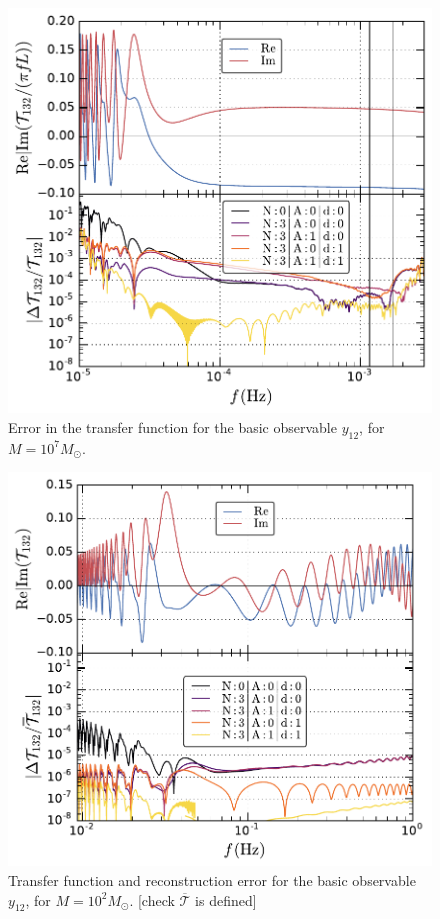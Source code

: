 \documentclass[aps,showpacs,twocolumn,
prd,superscriptaddress,nofootinbib]{revtex4-1}
\newcommand\calT{{\mathcal{T}}}
\newcommand{\Msol}{M_{\odot}}
\newcommand{\SM}[1]{{\color{Red} #1}}
\begin{document}
\begin{figure}
  \centering
  \includegraphics[width=.98\linewidth]{plots/LISAtransfererrorM1e7y12L_py.pdf}
  \caption{Error in the transfer function for the basic observable $y_{12}$, for $M=10^{7} \Msol$.}
  \label{fig:LISAerrorM1e7const}
\end{figure}

\begin{figure}
  \centering
  \includegraphics[width=.98\linewidth]{plots/LISAtransfererrorM1e2y12L_py.pdf}
  \caption{Transfer function and reconstruction error for the basic observable $y_{12}$, for $M=10^{2} \Msol$. \SM{[check $\overline{\calT}$ is defined]}}
  \label{fig:LISAerrorM1e2const}
\end{figure}
\end{document}
